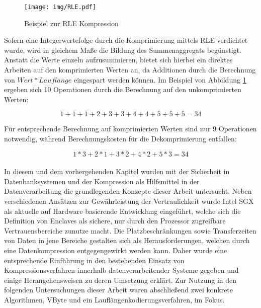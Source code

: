 \begin{figure}
	\texttt{[image: img/RLE.pdf]}
	\centering
	\caption{Beispiel zur RLE Kompression}
	\label{fig:rle}
\end{figure}

Sofern eine Integerwertefolge durch die Komprimierung mittels RLE verdichtet wurde, wird in gleichem Maße die Bildung des Summenaggregats begünstigt. Anstatt die Werte einzeln aufzusummieren, bietet sich hierbei ein direktes Arbeiten auf den komprimierten Werten an, da Additionen durch die Berechnung von $Wert * Laufl\ddot{a}nge$ eingespart werden können. Im Beispiel von Abbildung \ref{fig:rle} ergeben sich 10 Operationen durch die Berechnung auf den unkomprimierten Werten:

\begin{equation*}
	1 + 1 + 1 + 2 + 3 + 3 + 4 + 4 + 5 + 5 + 5 = 34
\end{equation*}

Für entsprechende Berechnung auf komprimierten Werten sind nur 9 Operationen notwendig, während Berechnungskosten für die Dekomprimierung entfallen:

\begin{equation*}
	1 * 3 + 2 * 1 + 3 * 2 + 4 * 2 + 5 * 3 = 34
\end{equation*}

\paragraph{}
In diesem und dem vorhergehenden Kapitel wurden mit der Sicherheit in Datenbanksystemen und der Kompression als Hilfsmittel in der Datenverarbeitung die grundlegenden Konzepte dieser Arbeit untersucht. Neben verschiedenen Ansätzen zur Gewährleistung der Vertraulichkeit wurde Intel SGX als aktuelle auf Hardware basierende Entwicklung eingeführt, welche sich die Definition von Enclaves als sichere, nur durch den Prozessor zugreifbare Vertrauensbereiche zunutze macht.
Die Platzbeschränkungen sowie Transferzeiten von Daten in jene Bereiche gestalten sich als Herausforderungen, welchen durch eine Datenkompression entgegengewirkt werden kann. Daher wurde eine entsprechende Einführung in den bestehenden Einsatz von Kompressionsverfahren innerhalb datenverarbeitender Systeme gegeben und einige Herangehensweisen zu deren Umsetzung erklärt. Zur Nutzung in den folgenden Untersuchungen dieser Arbeit waren abschließend zwei konkrete Algorithmen, VByte und ein Lauflängenkodierungsverfahren, im Fokus.
